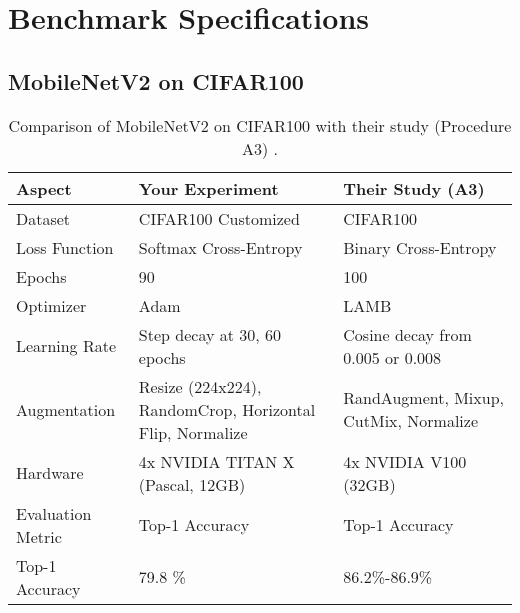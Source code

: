 \chapter{Benchmark Specifications} 

\section{MobileNetV2 on CIFAR100}

\begin{table}[H]
    \centering
    \caption{Comparison of MobileNetV2 on CIFAR100 with their study (Procedure A3) \cite{wightman2021resnetstrikesbackimproved}.}
    \begin{tabular}{lp{5cm}p{5cm}}
        \toprule
        \textbf{Aspect} & \textbf{Your Experiment} & \textbf{Their Study (A3)} \\ 
        \midrule
        Dataset            & CIFAR100 Customized                & CIFAR100                \\
        Loss Function      & Softmax Cross-Entropy   & Binary Cross-Entropy    \\
        Epochs             & 90                      & 100                     \\
        Optimizer          & Adam                    & LAMB                    \\
        Learning Rate      & Step decay at 30, 60 epochs & Cosine decay from 0.005 or 0.008 \\
        Augmentation       & Resize (224x224), RandomCrop, Horizontal Flip, Normalize & RandAugment, Mixup, CutMix, Normalize \\
        Hardware           & 4x NVIDIA TITAN X (Pascal, 12GB) & 4x NVIDIA V100 (32GB) \\
        Evaluation Metric  & Top-1 Accuracy          & Top-1 Accuracy          \\
        Top-1 Accuracy     & 79.8 \% & 86.2\%-86.9\%           \\
        \bottomrule
    \end{tabular}
    \label{tab:comparison_mobilenet}
\end{table}
